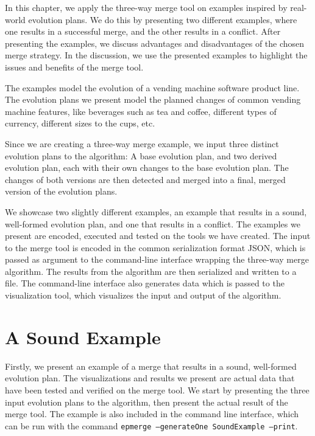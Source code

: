 \documentclass[a4paper,english]{ifimaster}
\begin{document}
In this chapter, we apply the three-way merge tool on examples inspired by real-world evolution plans. We do this by presenting two different examples, where one results in a successful merge, and the other results in a conflict. After presenting the examples, we discuss advantages and disadvantages of the chosen merge strategy. In the discussion, we use the presented examples to highlight the issues and benefits of the merge tool.

The examples model the evolution of a vending machine software product line. The evolution plans we present model the planned changes of common vending machine features, like beverages such as tea and coffee, different types of currency, different sizes to the cups, etc.

Since we are creating a three-way merge example, we input three distinct evolution plans to the algorithm: A base evolution plan, and two derived evolution plan, each with their own changes to the base evolution plan. The changes of both versions are then detected and merged into a final, merged version of the evolution plans.

We showcase two slightly different examples, an example that results in a sound, well-formed evolution plan, and one that results in a conflict. The examples we present are encoded, executed and tested on the tools we have created. The input to the merge tool is encoded in the common serialization format JSON, which is passed as argument to the command-line interface wrapping the three-way merge algorithm. The results from the algorithm are then serialized and written to a file. The command-line interface also generates data which is passed to the visualization tool, which visualizes the input and output of the algorithm.

\section{A Sound Example}%
\label{sec:a_sound_example}

Firstly, we present an example of a merge that results in a sound, well-formed evolution plan. The visualizations and results we present are actual data that have been tested and verified on the merge tool. We start by presenting the three input evolution plans to the algorithm, then present the actual result of the merge tool. The example is also included in the command line interface, which can be run with the command \texttt{epmerge --generateOne SoundExample --print}.
\end{document}
